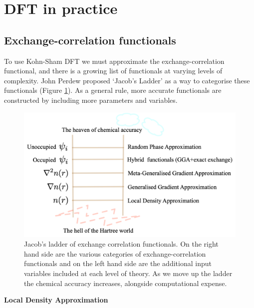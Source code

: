 \section{DFT in practice}

\subsection{Exchange-correlation functionals}
To use Kohn-Sham DFT we must approximate the exchange-correlation functional, and there is a growing list of functionals at varying levels of complexity. John Perdew proposed `Jacob's Ladder' as a way to categorise these functionals (Figure \ref{jladder}). As a general rule, more accurate functionals are constructed by including more parameters and variables.

\begin{figure}[h]
\centering
  \includegraphics[width=0.8\columnwidth]{figures/ch3/jladder.png}
  \caption[Jacob's ladder of exchange-correlation functionals]{Jacob's ladder of exchange correlation functionals. On the right hand side are the various categories of exchange-correlation functionals and on the left hand side are the additional input variables included at each level of theory. As we move up the ladder the chemical accuracy increases, alongside computational expense.}
  \label{jladder}
\end{figure}


\textbf{Local Density Approximation} 

